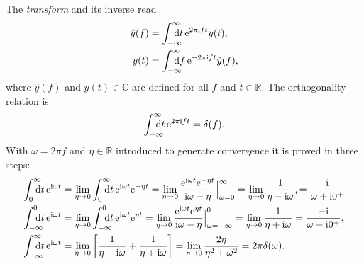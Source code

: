 The \emph{ transform} and its inverse read
%
\begin{align*}
    \hat y(f) &= \int \from{-\infty} \till \infty
    \D t \, \E^{2 \pi \I f t} y(t),
    \\
    y(t) &= \int \from{-\infty} \till \infty
    \D f \, \E^{-2 \pi \I f t} \hat y(f),
\end{align*}
%
where $\hat y(f)$ and $y(t) \in \mathds C$ are defined for all $f$ and $t \in
\mathds R$. The orthogonality relation is
%
\begin{equation*}
    \int \from{-\infty} \till \infty \D t \, \E^{2 \pi \I f t} = \delta(f).
\end{equation*}
%
With $\omega = 2 \pi f$ and $\eta \in \mathds R$ introduced to generate
convergence it is proved in three steps:
%
\begin{subequations}
    \begin{align}
        \label{int+ dt exp(i omega t)}
        \int \from 0 \till \infty \D t \, \E^{\I \omega t}
        &= \lim_{\eta \rightarrow 0}
            \int \from 0 \till \infty \D t \, \E^{\I \omega t} \E^{-\eta t}
        = \lim_{\eta \rightarrow 0}
            \frac{\E^{\I \omega t} \E^{-\eta t}}{\I \omega - \eta}
            \Big|_{\omega = 0}^\infty
        = \lim_{\eta \rightarrow 0} \frac 1 {\eta - \I \omega},
        = \frac \I {\omega + \I 0^+}
        \\
        \label{int- dt exp(i omega t)}
        \int \from{-\infty} \till 0 \D t \, \E^{\I \omega t}
        &= \lim_{\eta \rightarrow 0}
            \int \from{-\infty} \till 0 \D t \, \E^{\I \omega t} \E^{\eta t}
        = \lim_{\eta \rightarrow 0}
            \frac{\E^{\I \omega t} \E^{\eta t}}{\I \omega - \eta}
            \Big|_{\omega = -\infty}^0
        = \lim_{\eta \rightarrow 0} \frac 1 {\eta + \I \omega}
        = \frac{-\I}{\omega - \I 0^+},
        \\
        \label{int dt exp(i omega t)}
        \int \from{-\infty} \till \infty \D t \, \E^{\I \omega t}
        &= \lim_{\eta \rightarrow 0} \left[
            \frac 1 {\eta - \I \omega} + \frac 1 {\eta + \I \omega} \right]
        = \lim_{\eta \rightarrow 0} \frac{2 \eta}{\eta^2 + \omega^2}
        = 2 \pi \delta(\omega).
    \end{align}
\end{subequations}
